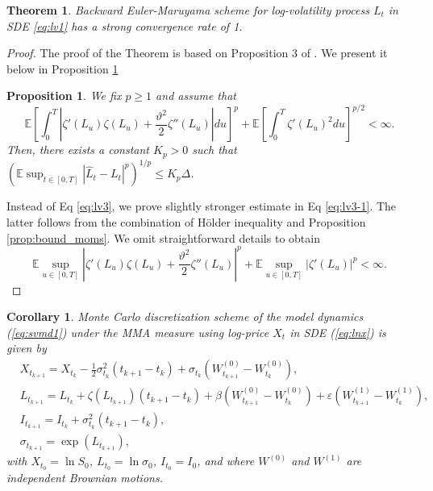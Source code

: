 \documentclass[11pt,a4paper] {article}
\newtheorem{corollary}{Corollary}[section]
\newtheorem{theorem}{Theorem}[section]
\newtheorem{proposition}{Proposition}[section]
\begin{document}
\begin{theorem}\label{thm:stron_conv_log_vol2}
Backward Euler-Maruyama scheme for log-volatility process $L_t$ in SDE \eqref{eq:lv1} has a strong convergence rate of 1. 
\end{theorem}


\begin{proof}
The proof of the Theorem is based on Proposition 3 of \cite{Alfonsi2}. We present it below in Proposition \ref{prop:stron_conv_log_vol}  
\begin{proposition}\label{prop:stron_conv_log_vol}
We fix $p\ge 1$ and assume that
\begin{equation}\label{eq:lv3}
\mathbb{E}\left[\int_0^T\left|\zeta'(L_u)\zeta(L_u)+\frac{\vartheta^2}{2}\zeta''(L_u)\right|du\right]^p+
\mathbb{E}\left[\int_0^T\zeta'(L_u)^2du\right]^{p/2}<\infty.
\end{equation}
Then, there exists a constant $K_p>0$ such that $
\left(\mathbb{E}\sup_{t\in [0,T]}\left|\hat L_t-L_t\right|^p\right)^{1/p}\le K_p\Delta
$.
\end{proposition}
Instead of Eq \eqref{eq:lv3}, we prove slightly stronger estimate in Eq \eqref{eq:lv3-1}. The latter follows from the combination of H\"{o}lder inequality and  Proposition \ref{prop:bound_moms}. We omit straightforward details to obtain
\begin{equation}\label{eq:lv3-1}
\mathbb{E}\sup_{u\in [0,T]}\left|\zeta'(L_u)\zeta(L_u)+\frac{\vartheta^2}{2}\zeta''(L_u)\right|^p+
\mathbb{E}\sup_{u\in [0,T]}\left|\zeta'(L_u)\right|^p<\infty.
\end{equation}
\end{proof}



\begin{corollary} Monte Carlo discretization scheme of the model dynamics (\ref{eq:svmd1}) under the MMA measure using log-price $X_{t}$ in SDE (\ref{eq:lnx}) is given by
\begin{equation} \label{eq:msj}
\begin{split}
&X_{t_{k+1}}=X_{t_{k}}-\frac{1}{2}\sigma^{2}_{t_{k}}(t_{k+1}-t_k) +\sigma_{t_{k}} \left(W^{(0)}_{t_{k+1}}-W^{(0)}_{t_k}\right),\\
&  L_{t_{k+1}}= L_{t_k}+\zeta\left( L_{t_{k+1}}\right)(t_{k+1}-t_k)+\beta\left(W^{(0)}_{t_{k+1}}-W^{(0)}_{t_k}\right)+\varepsilon\left(W^{(1)}_{t_{k+1}}-W^{(1)}_{t_k}\right), \\
& I_{t_{k+1}}=I_{t_{k}}+ \sigma^{2}_{t_{k}}(t_{k+1}-t_k), \\
& \sigma_{t_{k+1}} = \exp( L_{t_{k+1}}),
\end{split}
\end{equation}
with $X_{t_{0}} = \ln S_{0}$, $L_{t_{0}}=\ln \sigma_{0}$, $I_{t_{0}}=I_{0}$, and where $W^{(0)}$ and $W^{(1)}$ are independent Brownian motions. 
\end{corollary}
\end{document}
